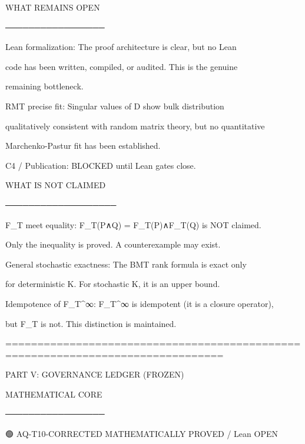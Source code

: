 WHAT REMAINS OPEN

─────────────────






Lean formalization: The proof architecture is clear, but no Lean

code has been written, compiled, or audited. This is the genuine

remaining bottleneck.






RMT precise fit: Singular values of D show bulk distribution

qualitatively consistent with random matrix theory, but no quantitative

Marchenko-Pastur fit has been established.






C4 / Publication: BLOCKED until Lean gates close.






WHAT IS NOT CLAIMED

───────────────────






F_T meet equality: F_T(P∧Q) = F_T(P)∧F_T(Q) is NOT claimed.

Only the inequality is proved. A counterexample may exist.






General stochastic exactness: The BMT rank formula is exact only

for deterministic K. For stochastic K, it is an upper bound.






Idempotence of F_T^∞: F_T^∞ is idempotent (it is a closure operator),

but F_T is not. This distinction is maintained.






================================================================================

PART V: GOVERNANCE LEDGER (FROZEN)


MATHEMATICAL CORE

─────────────────

🟢 AQ-T10-CORRECTED              MATHEMATICALLY PROVED / Lean OPEN

